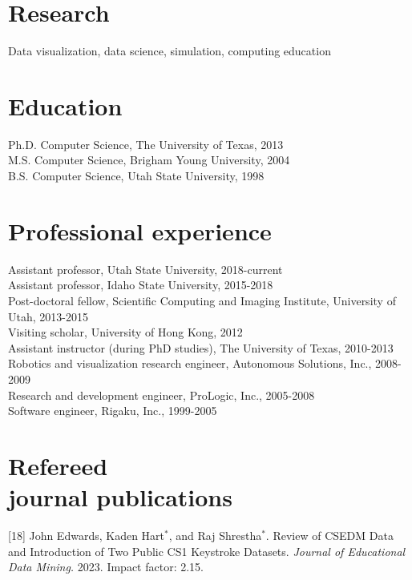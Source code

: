 \documentclass[margin,line]{res}
\newcommand{\jnum}[1]{[#1]}
\begin{document}
\begin{resume}
\section{\sc Research}

Data visualization, data science, simulation, computing education

\section{\sc Education}

Ph.D. Computer Science, The University of Texas, 2013\\
M.S. Computer Science, Brigham Young University, 2004\\
B.S. Computer Science, Utah State University, 1998\\

\section{\sc Professional experience}

Assistant professor, Utah State University, 2018-current\\
Assistant professor, Idaho State University, 2015-2018\\
Post-doctoral fellow, Scientific Computing and Imaging
Institute, University of Utah, 2013-2015\\
Visiting scholar, University of Hong Kong, 2012\\
Assistant instructor (during PhD studies), The University of Texas, 2010-2013\\
Robotics and visualization research engineer, Autonomous Solutions, Inc., 2008-2009\\
Research and development engineer, ProLogic, Inc., 2005-2008 \\
Software engineer, Rigaku, Inc., 1999-2005 \\

\section{\sc Refereed \\ journal publications}%
\jnum{18} John Edwards, Kaden Hart$^*$, and Raj Shrestha$^*$. Review of CSEDM Data and Introduction of Two Public CS1 Keystroke Datasets. \textit{Journal of Educational Data Mining.} 2023. Impact factor: 2.15.


\end{resume}
\end{document}
